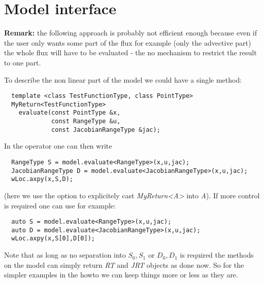 \documentclass{article}
\begin{document}
\section{Model interface}

{\bf Remark:} the following approach is probably not efficient enough because even if
the user only wants some part of the flux for example (only the advective part) the
whole flux will have to be evaluated - the no mechanism to restrict the result to one
part.

To describe the non linear part of the model we could have a single method:
\begin{lstlisting}
  template <class TestFunctionType, class PointType> 
  MyReturn<TestFunctionType> 
    evaluate(const PointType &x, 
             const RangeType &u,
             const JacobianRangeType &jac);
\end{lstlisting}
In the operator one can then write
\begin{lstlisting}
  RangeType S = model.evaluate<RangeType>(x,u,jac);
  JacobianRangeType D = model.evaluate<JacobianRangeType>(x,u,jac);
  wLoc.axpy(x,S,D);
\end{lstlisting}
(here we use the option to explicitely cast \emph{MyReturn<A>} into
\emph{A}).
If more control is required one can use for example:
\begin{lstlisting}
  auto S = model.evaluate<RangeType>(x,u,jac);
  auto D = model.evaluate<JacobianRangeType>(x,u,jac);
  wLoc.axpy(x,S[0],D[0]);
\end{lstlisting}
Note that as long as no separation into $S_0,S_1$ or $D_0,D_1$ is required
the methods on the model can simply return \emph{RT} and \emph{JRT} objects
as done now. So for the simpler examples in the howto we can keep things
more or less as they are. 
\end{document}
